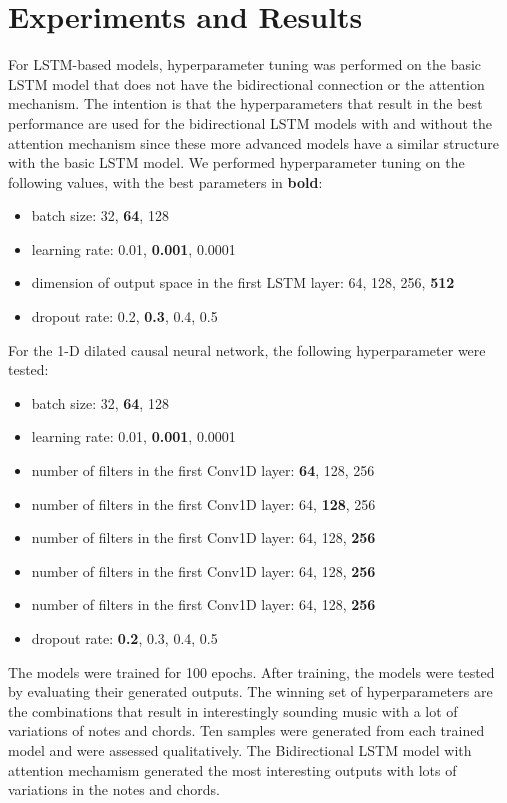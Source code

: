 \documentclass[sigconf,authorversion]{acmart}
\providecommand{\tightlist}{%
  \setlength{\itemsep}{0pt}\setlength{\parskip}{0pt}}
\begin{document}
\section{Experiments and Results}

For LSTM-based models, hyperparameter tuning was performed on the basic LSTM model 
that does not have the bidirectional connection or the attention mechanism. 
The intention is that the hyperparameters that result in the best performance 
are used for the bidirectional LSTM models with and without the attention mechanism
since these more advanced models have a similar structure with the basic LSTM
model. We performed hyperparameter tuning on the following values, with the 
best parameters in \textbf{bold}:

\begin{itemize}
  \tightlist
  \item batch size: 32, \textbf{64}, 128
  \item learning rate: 0.01, \textbf{0.001}, 0.0001
  \item dimension of output space in the first LSTM layer: 64, 128, 256, \textbf{512} 
  \item dropout rate: 0.2, \textbf{0.3}, 0.4, 0.5
\end{itemize}

For the 1-D dilated causal neural network, the following hyperparameter were tested:

\begin{itemize}
  \tightlist
  \item batch size: 32, \textbf{64}, 128
  \item learning rate: 0.01, \textbf{0.001}, 0.0001
  \item number of filters in the first Conv1D layer: \textbf{64}, 128, 256
  \item number of filters in the first Conv1D layer: 64, \textbf{128}, 256
  \item number of filters in the first Conv1D layer: 64, 128, \textbf{256}
  \item number of filters in the first Conv1D layer: 64, 128, \textbf{256}
  \item number of filters in the first Conv1D layer: 64, 128, \textbf{256}
  \item dropout rate: \textbf{0.2}, 0.3, 0.4, 0.5
\end{itemize}

The models were trained for 100 epochs. After training, the models were tested by evaluating
 their generated outputs. The winning set of hyperparameters are the combinations that result
in interestingly sounding music with a lot of variations of notes and chords. Ten samples
were generated from each trained model and were assessed qualitatively. The Bidirectional
LSTM model with attention mechamism generated the most interesting outputs with lots of
variations in the notes and chords.
\end{document}
